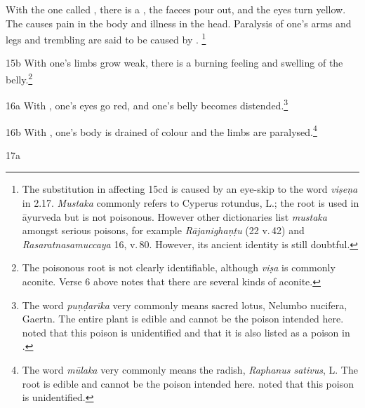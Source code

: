 \begin{translation}
    With the one called
    ,
    there is a , the faeces pour out, and  the eyes
    turn yellow.
The
causes pain in the body and illness in the head.
    Paralysis of one's arms and legs and trembling are said to be caused by
    .%
\footnote{The substitution 
    in  affecting 15cd is caused by an eye-skip to the word 
    \emph{viṣeṇa} in 2.17.  \emph{Mustaka} commonly refers to Cyperus 
    rotundus, L.; the root is used in āyurveda but is 
    not poisonous.  However other dictionaries list \emph{mustaka} amongst 
    serious poisons, for example \emph{Rājanighaṇṭu} (22 v.\,42) and 
    \emph{Rasaratnasamuccaya} 16, v.\,80.  However, its ancient identity is still 
    doubtful.}
    \item[ 15b]
    With 
    one's limbs grow weak, there is a burning
    feeling and swelling of the belly.\footnote{The poisonous root 
     is not clearly identifiable, although \emph{viṣa} 
    is commonly aconite.  Verse 6 above notes that there are several kinds of 
    aconite.}
    \item[ 16a]
    With ,
    one's eyes go red, and one's belly becomes distended.\footnote{The word 
    \emph{puṇḍarīka} very commonly means sacred lotus, Nelumbo nucifera, 
    Gaertn. The entire plant is edible and cannot be the poison intended here.  
    \citet[252]{sing-1972} noted that this poison is unidentified and that it is also 
    listed as a poison in .}
    \item[ 16b]
    With ,
    one's body is drained of colour and the limbs are paralysed.\footnote{The word 
    \emph{mūlaka} very commonly means the radish, \emph{Raphanus sativus}, 
    L. The root is edible and cannot be the poison intended here.  
    \citet[317]{sing-1972} noted that this poison is unidentified.}
    
    \item[ 17a]
        

\end{translation}

